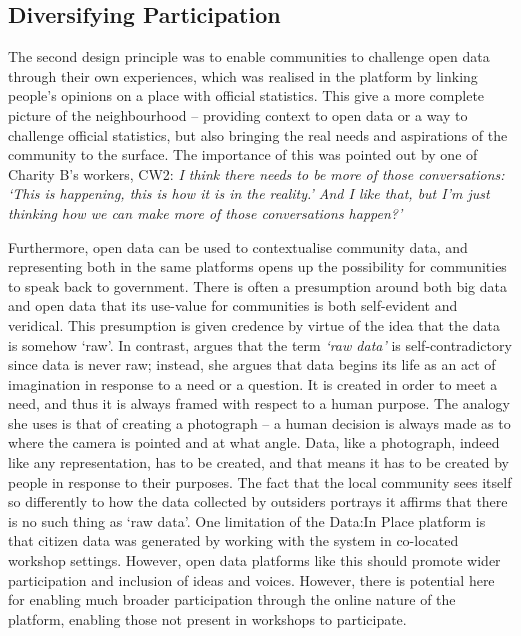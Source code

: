 \subsection{Diversifying Participation}
The second design principle was to enable communities to challenge open data through their own experiences, which was realised in the platform by linking people's opinions on a place with official statistics. This give a more complete picture of the neighbourhood -- providing context to open data or a way to challenge official statistics, but also bringing the real needs and aspirations of the community to the surface. The importance of this was pointed out by one of Charity B's workers, CW2: \textit{I think there needs to be more of those conversations: `This is happening, this is how it is in the reality.' And I like that, but I'm just thinking how we can make more of those conversations happen?'}

Furthermore, open data can be used to contextualise community data, and representing both in the same platforms opens up the possibility for communities to speak back to government. There is often a presumption around both big data and open data that its use-value for communities is both self-evident and veridical. This presumption is given credence by virtue of the idea that the data is somehow `raw'. In contrast, \citet{gitelman_raw_2013} argues that the term \textit{`raw data'} is self-contradictory since data is never raw; instead, she argues that data begins its life as an act of imagination in response to a need or a question. It is created in order to meet a need, and thus it is always framed with respect to a human purpose. The analogy she uses is that of creating a photograph -- a human decision is always made as to where the camera is pointed and at what angle. Data, like a photograph, indeed like any representation, has to be created, and that means it has to be created by people in response to their purposes. The fact that the local community sees itself so differently to how the data collected by outsiders portrays it affirms that there is no such thing as `raw data'. One limitation of the Data:In Place platform is that citizen data was generated by working with the system in co-located workshop settings. However, open data platforms like this should promote wider participation and inclusion of ideas and voices. However, there is potential here for enabling much broader participation through the online nature of the platform, enabling those not present in workshops to participate.

